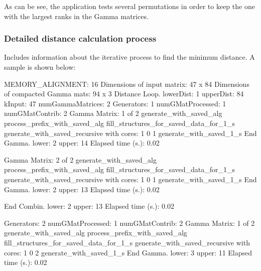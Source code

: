 \documentclass[]{article}
\newenvironment{Shaded}{}{}
\newcommand{\BuiltInTok}[1]{#1}
\newcommand{\ExtensionTok}[1]{#1}
\newcommand{\NormalTok}[1]{#1}
\begin{document}
As can be see, the application tests several permutations in order to
keep the one with the largest ranks in the Gamma matrices.

\hypertarget{detailed-distance-calculation-process}{%
\subsubsection{Detailed distance calculation
process}\label{detailed-distance-calculation-process}}

Includes information about the iterative process to find the minimum
distance. A sample is shown below:

\begin{Shaded}
\begin{Highlighting}[]
\ExtensionTok{MEMORY_ALIGNMENT}\NormalTok{:                   16}
\ExtensionTok{Dimensions}\NormalTok{ of input matrix:         47 x 84 }
\ExtensionTok{Dimensions}\NormalTok{ of compacted Gamma mats: 94 x 3 }
\ExtensionTok{Distance}\NormalTok{ Loop. lowerDist: 1  upperDist: 84 }
\ExtensionTok{kInput}\NormalTok{:            47}
\ExtensionTok{numGammaMatrices}\NormalTok{:  2}
  \ExtensionTok{Generators}\NormalTok{: 1}
  \ExtensionTok{numGMatProcessed}\NormalTok{: 1}
  \ExtensionTok{numGMatContrib}\NormalTok{:   2}
    \ExtensionTok{Gamma}\NormalTok{ Matrix: 1 of 2 }
    \ExtensionTok{generate_with_saved_alg}
    \ExtensionTok{process_prefix_with_saved_alg}
    \ExtensionTok{fill_structures_for_saved_data_for_1_s}
    \ExtensionTok{generate_with_saved_recursive}\NormalTok{ with cores: 1  0 1}
    \ExtensionTok{generate_with_saved_1_s}
    \ExtensionTok{End}\NormalTok{ Gamma. lower:  2  upper: 14        Elapsed time (s.)}\BuiltInTok{:}\NormalTok{ 0.02}

    \ExtensionTok{Gamma}\NormalTok{ Matrix: 2 of 2 }
    \ExtensionTok{generate_with_saved_alg}
    \ExtensionTok{process_prefix_with_saved_alg}
    \ExtensionTok{fill_structures_for_saved_data_for_1_s}
    \ExtensionTok{generate_with_saved_recursive}\NormalTok{ with cores: 1  0 1}
    \ExtensionTok{generate_with_saved_1_s}
    \ExtensionTok{End}\NormalTok{ Gamma. lower:  2  upper: 13        Elapsed time (s.)}\BuiltInTok{:}\NormalTok{ 0.02}

  \ExtensionTok{End}\NormalTok{ Combin.  lower:  2  upper: 13        Elapsed time (s.)}\BuiltInTok{:}\NormalTok{ 0.02}

  \ExtensionTok{Generators}\NormalTok{: 2}
  \ExtensionTok{numGMatProcessed}\NormalTok{: 1}
  \ExtensionTok{numGMatContrib}\NormalTok{:   2}
    \ExtensionTok{Gamma}\NormalTok{ Matrix: 1 of 2 }
    \ExtensionTok{generate_with_saved_alg}
    \ExtensionTok{process_prefix_with_saved_alg}
    \ExtensionTok{fill_structures_for_saved_data_for_1_s}
    \ExtensionTok{generate_with_saved_recursive}\NormalTok{ with cores: 1  0 2}
    \ExtensionTok{generate_with_saved_1_s}
    \ExtensionTok{End}\NormalTok{ Gamma. lower:  3  upper: 11        Elapsed time (s.)}\BuiltInTok{:}\NormalTok{ 0.02}


\end{Highlighting}
\end{Shaded}
\end{document}
